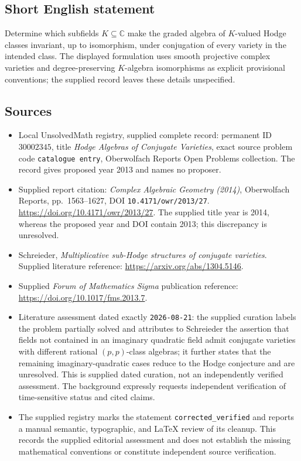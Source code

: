 \documentclass[11pt]{article}
\newcommand{\C}{\mathbb{C}}
\begin{document}
\subsection{Short English statement}
Determine which subfields \(K\subseteq\C\) make the graded algebra of \(K\)-valued Hodge classes invariant, up to isomorphism, under conjugation of every variety in the intended class. The displayed formulation uses smooth projective complex varieties and degree-preserving \(K\)-algebra isomorphisms as explicit provisional conventions; the supplied record leaves these details unspecified.
\subsection{Sources}
\begin{itemize}
\item Local UnsolvedMath registry, supplied complete record: permanent ID \(30002345\), title \emph{Hodge Algebras of Conjugate Varieties}, exact source problem code \texttt{catalogue entry}, Oberwolfach Reports Open Problems collection. The record gives proposed year 2013 and names no proposer.
\item Supplied report citation: \emph{Complex Algebraic Geometry (2014)}, Oberwolfach Reports, pp.~1563--1627, DOI \texttt{10.4171/owr/2013/27}. \url{https://doi.org/10.4171/owr/2013/27}. The supplied title year is 2014, whereas the proposed year and DOI contain 2013; this discrepancy is unresolved.
\item Schreieder, \emph{Multiplicative sub-Hodge structures of conjugate varieties}. Supplied literature reference: \url{https://arxiv.org/abs/1304.5146}.
\item Supplied \emph{Forum of Mathematics Sigma} publication reference: \url{https://doi.org/10.1017/fms.2013.7}.
\item Literature assessment dated exactly \texttt{2026-08-21}: the supplied curation labels the problem partially solved and attributes to Schreieder the assertion that fields not contained in an imaginary quadratic field admit conjugate varieties with different rational \((p,p)\)-class algebras; it further states that the remaining imaginary-quadratic cases reduce to the Hodge conjecture and are unresolved. This is supplied dated curation, not an independently verified assessment. The background expressly requests independent verification of time-sensitive status and cited claims.
\item The supplied registry marks the statement \texttt{corrected\_verified} and reports a manual semantic, typographic, and LaTeX review of its cleanup. This records the supplied editorial assessment and does not establish the missing mathematical conventions or constitute independent source verification.
\end{itemize}
\end{document}

